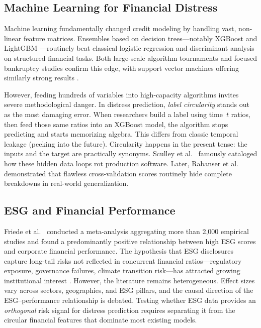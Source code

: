 \documentclass[sigconf,anonymous]{acmart}
\begin{document}
\subsection{Machine Learning for Financial Distress}
Machine learning fundamentally changed credit modeling by handling vast, non-linear feature matrices. Ensembles based on decision trees---notably XGBoost \cite{chen2016} and LightGBM \cite{ke2017}---routinely beat classical logistic regression and discriminant analysis on structured financial tasks. Both large-scale algorithm tournaments \cite{lessmann2015} and focused bankruptcy studies \cite{barboza2017} confirm this edge, with support vector machines offering similarly strong results \cite{bellotti2009}.

However, feeding hundreds of variables into high-capacity algorithms invites severe methodological danger. In distress prediction, \textit{label circularity} stands out as the most damaging error. When researchers build a label using time~$t$ ratios, then feed those same ratios into an XGBoost model, the algorithm stops predicting and starts memorizing algebra. This differs from classic temporal leakage (peeking into the future). Circularity happens in the present tense: the inputs and the target are practically synonyms. Sculley et al.\ \cite{sculley2015} famously cataloged how these hidden data loops rot production software. Later, Rabanser et al.\ \cite{rabanser2019} demonstrated that flawless cross-validation scores routinely hide complete breakdowns in real-world generalization.

\subsection{ESG and Financial Performance}
Friede et al.\ \cite{friede2015} conducted a meta-analysis aggregating more than 2,000 empirical studies and found a predominantly positive relationship between high ESG scores and corporate financial performance. The hypothesis that ESG disclosures capture long-tail risks not reflected in concurrent financial ratios---regulatory exposure, governance failures, climate transition risk---has attracted growing institutional interest \cite{bassen2006}. However, the literature remains heterogeneous. Effect sizes vary across sectors, geographies, and ESG pillars, and the causal direction of the ESG--performance relationship is debated. Testing whether ESG data provides an \textit{orthogonal} risk signal for distress prediction requires separating it from the circular financial features that dominate most existing models.
\end{document}
